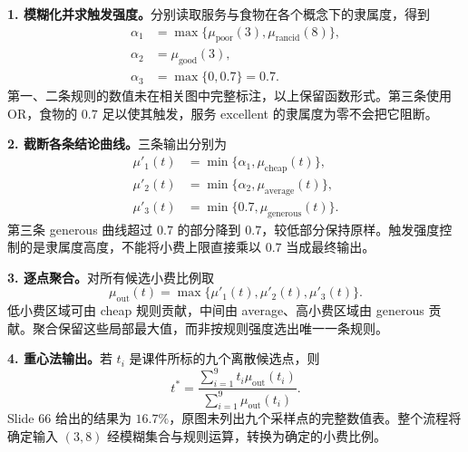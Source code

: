 \begin{workedsolution}
\textbf{1. 模糊化并求触发强度。}分别读取服务与食物在各个概念下的隶属度，得到
\[
 \begin{aligned}
  \alpha_1&=\max\{\mu_{\mathrm{poor}}(3),\mu_{\mathrm{rancid}}(8)\},\\
  \alpha_2&=\mu_{\mathrm{good}}(3),\\
  \alpha_3&=\max\{0,0.7\}=0.7.
 \end{aligned}
\]
第一、二条规则的数值未在相关图中完整标注，以上保留函数形式。第三条使用 OR，食物的 $0.7$ 足以使其触发，服务 excellent 的隶属度为零不会把它阻断。

\textbf{2. 截断各条结论曲线。}三条输出分别为
\[
 \begin{aligned}
  \mu'_1(t)&=\min\{\alpha_1,\mu_{\mathrm{cheap}}(t)\},\\
  \mu'_2(t)&=\min\{\alpha_2,\mu_{\mathrm{average}}(t)\},\\
  \mu'_3(t)&=\min\{0.7,\mu_{\mathrm{generous}}(t)\}.
 \end{aligned}
\]
第三条 generous 曲线超过 $0.7$ 的部分降到 $0.7$，较低部分保持原样。触发强度控制的是隶属度高度，不能将小费上限直接乘以 $0.7$ 当成最终输出。

\textbf{3. 逐点聚合。}对所有候选小费比例取
\[
 \mu_{\mathrm{out}}(t)=\max\{\mu'_1(t),\mu'_2(t),\mu'_3(t)\}.
\]
低小费区域可由 cheap 规则贡献，中间由 average、高小费区域由 generous 贡献。聚合保留这些局部最大值，而非按规则强度选出唯一一条规则。

\textbf{4. 重心法输出。}若 $t_i$ 是课件所标的九个离散候选点，则
\[
 t^*=\frac{\sum_{i=1}^{9}t_i\mu_{\mathrm{out}}(t_i)}
 {\sum_{i=1}^{9}\mu_{\mathrm{out}}(t_i)}.
\]
Slide 66 给出的结果为 $\boxed{16.7\%}$，原图未列出九个采样点的完整数值表。整个流程将确定输入 $(3,8)$ 经模糊集合与规则运算，转换为确定的小费比例。
\end{workedsolution}
\endgroup

